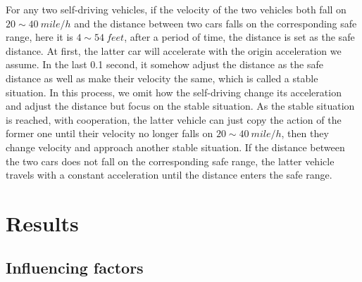 \documentclass[a4paper]{article}
\begin{document}
\begin{itemize}
		For any two self-driving vehicles, if the velocity of the two vehicles both fall on $ 20\sim 40\  mile/h $ and the distance between two cars falls on the corresponding safe range, here it is $ 4\sim54\  feet$, after a period of time, the distance is set as the safe distance. At first, the latter car will accelerate with the origin acceleration we assume. In the last 0.1 second, it somehow adjust the distance as the safe distance as well as make their velocity the same, which is called a stable situation. In this process, we omit how the self-driving change its acceleration and adjust the distance but focus on the stable situation. As the stable situation is reached, with cooperation, the latter vehicle can just copy the action of the former one until their velocity no longer falls on $ 20\sim 40\  mile/h $, then they change velocity and approach another stable situation. If the distance between the two cars does not fall on the corresponding safe range, the latter vehicle travels with a constant acceleration until the distance enters the safe range.
	\end{itemize}



	\section{Results}
	\subsection{Influencing factors}
\end{document}
